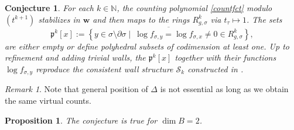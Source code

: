 \documentclass[11pt,letter]{amsart}
\newtheorem{proposition}[theorem]{Proposition}
\newtheorem{conjecture}[theorem]{Conjecture}
\theoremstyle{definition}
\theoremstyle{remark}
\newtheorem{remark}[theorem]{Remark}
\numberwithin{equation}{section}
\numberwithin{figure}{section}
\newcommand {\fop}  {\mathfrak{p}}
\newcommand {\scrS}  {\mathscr{S}}
\newcommand{\set}[2]{ \left\{ \left. {#1}  \; \right| \;\: {#2} \right\} }
\newcommand{\targetring}{R_{g,\sigma}^k}
\begin{document}
\begin{conjecture}
\label{conject}
For each $k \in \mathbb N$, the counting polynomial \eqref{countfct} modulo
$(t^{k+1})$ stabilizes in $\mathbf w$ and then maps to the rings $\targetring$
via $t_\tau \mapsto 1$. The sets
\begin{equation}
\label{wall}
\fop^k[x]:= \overline{  \set{ y\in \sigma \setminus \partial \sigma }
{\log f_{\sigma,y}  =\log f_{\sigma,x} \not = 0 \in \targetring}},
\end{equation}
are either empty or define polyhedral subsets of codimension at least one. Up to
refinement and adding trivial walls, the $\fop^k[x]$ together with their
functions $\log f_{\sigma,y}$ reproduce the consistent wall structure $\scrS_k$
constructed in \cite{affinecomplex}.
\end{conjecture}

\begin{remark}
Note that general position of $\Delta$ is not essential as long as we obtain the
same virtual counts.
\end{remark}

\begin{proposition}
The conjecture is true for $\dim B = 2$.
\end{proposition}
\end{document}
